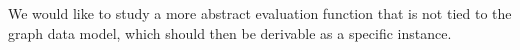 %
We would like to study a more abstract evaluation function that is not tied to the graph data model, which should then be derivable as a specific instance. 

